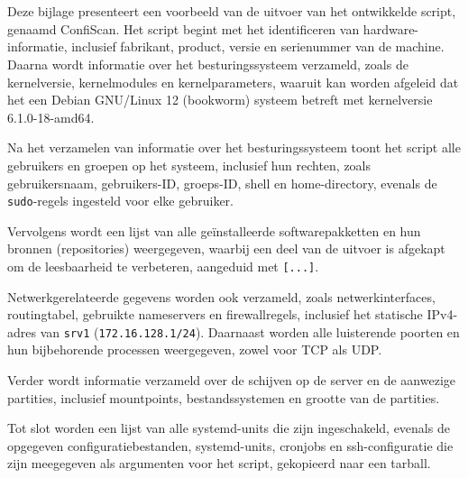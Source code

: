 
\chapter{}%
\label{ch:bijlage_confiscan}

Deze bijlage presenteert een voorbeeld van de uitvoer van het ontwikkelde script, genaamd ConfiScan.
Het script begint met het identificeren van hardware-informatie, inclusief fabrikant, product, versie en serienummer van de machine.
Daarna wordt informatie over het besturingssysteem verzameld, zoals de kernelversie, kernelmodules en kernelparameters, waaruit kan worden afgeleid dat het een Debian GNU/Linux 12 (bookworm) systeem betreft met kernelversie 6.1.0-18-amd64.

Na het verzamelen van informatie over het besturingssysteem toont het script alle gebruikers en groepen op het systeem, inclusief hun rechten, zoals gebruikersnaam, gebruikers-ID, groeps-ID, shell en home-directory, evenals de \texttt{sudo}-regels ingesteld voor elke gebruiker.

Vervolgens wordt een lijst van alle ge\"installeerde softwarepakketten en hun bronnen (repositories) weergegeven, waarbij een deel van de uitvoer is afgekapt om de leesbaarheid te verbeteren, aangeduid met \texttt{[...]}.

Netwerkgerelateerde gegevens worden ook verzameld, zoals netwerkinterfaces, routingtabel, gebruikte nameservers en firewallregels, inclusief het statische IPv4-adres van \texttt{srv1} (\texttt{172.16.128.1/24}).
Daarnaast worden alle luisterende poorten en hun bijbehorende processen weergegeven, zowel voor TCP als UDP.

Verder wordt informatie verzameld over de schijven op de server en de aanwezige partities, inclusief mountpoints, bestandssystemen en grootte van de partities.

Tot slot worden een lijst van alle systemd-units die zijn ingeschakeld, evenals de opgegeven configuratiebestanden, systemd-units, cronjobs en ssh-configuratie die zijn meegegeven als argumenten voor het script, gekopieerd naar een tarball.

